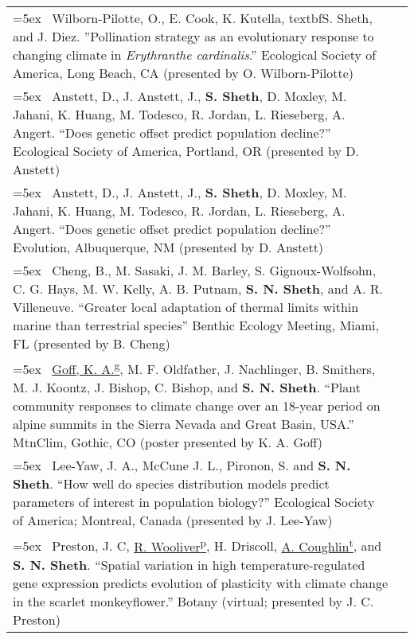 \documentclass[11pt,english]{article}
\providecommand{\tabularnewline}{\\}
\begin{document}
\renewcommand{\arraystretch}{1.2}
\begin{tabularx}{\textwidth}{@{}>{\raggedright}p{5.25in} >{\raggedleft}X@{}}

\hangindent=5ex \ Wilborn-Pilotte, O., E. Cook, K. Kutella, textbf{S. Sheth}, and J. Diez. ''Pollination strategy as an evolutionary response to changing climate in \emph{Erythranthe cardinalis}.'' Ecological Society of America, Long Beach, CA (presented by O. Wilborn-Pilotte) & 2024 \tabularnewline

\hangindent=5ex \ Anstett, D., J. Anstett, J., \textbf{S. Sheth}, D. Moxley, M. Jahani, K. Huang, M. Todesco, R. Jordan, L. Rieseberg, A. Angert. ``Does genetic offset predict population decline?'' Ecological Society of America, Portland, OR (presented by D. Anstett) & 2023 \tabularnewline

\hangindent=5ex \ Anstett, D., J. Anstett, J., \textbf{S. Sheth}, D. Moxley, M. Jahani, K. Huang, M. Todesco, R. Jordan, L. Rieseberg, A. Angert. ``Does genetic offset predict population decline?'' Evolution, Albuquerque, NM (presented by D. Anstett) & 2023 \tabularnewline

\hangindent=5ex \ Cheng, B., M. Sasaki, J. M. Barley, S. Gignoux-Wolfsohn, C. G. Hays, M. W. Kelly, A. B. Putnam, \textbf{S. N. Sheth}, and A. R. Villeneuve. ``Greater local adaptation of thermal limits within marine than terrestrial species'' Benthic Ecology Meeting, Miami, FL (presented by B. Cheng) & 2023 \tabularnewline

\hangindent=5ex \ \underline{Goff, K. A.\textsuperscript{g}}, M. F. Oldfather, J. Nachlinger, B. Smithers, M. J. Koontz, J. Bishop, C. Bishop, and \textbf{S. N. Sheth}. ``Plant community responses to climate change over an 18-year period on alpine summits in the Sierra Nevada and Great Basin, USA.'' MtnClim, Gothic, CO (poster presented by K. A. Goff) & 2022 \tabularnewline

\hangindent=5ex \ Lee-Yaw, J. A., McCune J. L., Pironon, S. and \textbf{S. N. Sheth}. ``How well do species distribution models predict parameters of interest in population biology?'' Ecological Society of America; Montreal, Canada (presented by J. Lee-Yaw) & 2022 \tabularnewline

\hangindent=5ex \ Preston, J. C, \underline{R. Wooliver\textsuperscript{p}}, H. Driscoll, \underline{A. Coughlin\textsuperscript{t}}, and \textbf{S. N. Sheth}. ``Spatial variation in high temperature-regulated gene expression predicts evolution of plasticity with climate change in the scarlet monkeyflower.'' Botany (virtual; presented by J. C. Preston) & 2021 \tabularnewline


\end{tabularx}
\end{document}
